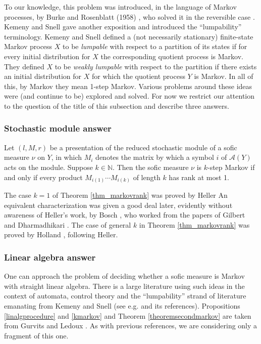 \documentclass{kepart2010}
\theoremstyle{plain}
\theoremstyle{definition}
\theoremstyle{remark}
\theoremstyle{definition}
\numberwithin{equation}{section}
\begin{document}
{To our knowledge, this problem was introduced, in the language of
Markov processes, by Burke and Rosenblatt (1958)
 \cite{BurkeRosenblatt1958}, who solved it in
the reversible case \cite[Theorem 1]{BurkeRosenblatt1958}.} Kemeny
and Snell \cite[Theorems 6.4.8 and 6.3.2]{KemenySnell1960} gave
another exposition
and introduced the ``lumpability'' terminology.
 Kemeny and Snell defined a (not necessarily
stationary) finite-state Markov process $X$ to be {\it lumpable}
with respect to a partition of its states if for every initial
distribution for $X$ the corresponding quotient process is Markov.
They defined $X$ to be {\it weakly lumpable} with respect to the
partition if there exists an initial distribution for $X$ for which
the quotient process $Y$ is Markov. In all of this, by Markov they
mean 1-step Markov.
Various problems around
these ideas were (and continue to be) explored and solved.
For now
 we restrict our attention to the question of the title of this
subsection and describe three answers.

\subsubsection{Stochastic module answer}

\begin{thm}\label{thm_markovrank}  Let $(l,M,r)$ be
a presentation of the reduced stochastic module of a sofic measure
$\nu$ on $Y$, in which $M_i$ denotes the matrix by which a symbol
$i$ of $\mathcal A(Y)$ acts on the module. Suppose $k\in \mathbb N$.
Then the sofic measure $\nu$ is $k$-step Markov if and only if every
product $M_{i(1)}\cdots M_{i(k)}$ of length $k$ has rank at most 1.
\end{thm}

The case $k=1$ of Theorem \ref{thm_markovrank} was proved by Heller
\cite[Prop.3.2]{Heller1965} An equivalent characterization was given
a good deal later, evidently without awareness of Heller's work, by
Bosch \cite{Bosch1974/75}, who worked from the papers of Gilbert
\cite{Gilbert1959} and Dharmadhikari \cite{Dharma1963}. The case of
general $k$ in Theorem \ref{thm_markovrank} was proved by Holland
\cite[Theorem 4]{Holland1968}, following Heller.

\subsubsection{Linear algebra answer}

{ One can approach the problem of deciding whether a sofic measure
is Markov with straight linear algebra. There is a large literature
using such ideas in the context of automata, control theory and the
``lumpability'' strand of literature emanating from Kemeny and Snell
(see e.g. \cite{GurvitsLedoux2005} and its references). Propositions
\ref{linalgprocedure} and \ref{kmarkov} and Theorem
\ref{theoremsecondmarkov} are taken from Gurvits and Ledoux
\cite{GurvitsLedoux2005}. As with previous references, we are
considering only a fragment of this one. }
\end{document}
